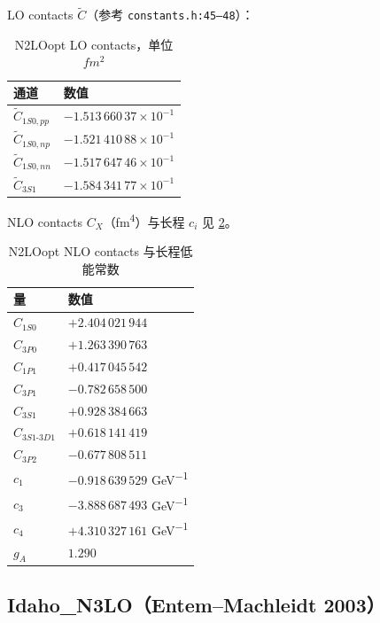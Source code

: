 LO contacts $\widetilde{C}$（参考 \texttt{constants.h:45–48}）：
\begin{table}[htbp]
\centering
\caption{N2LOopt LO contacts，单位 $\si{fm^2}$}
\label{tab:appA_n2loopt_lo}
\begin{tabular}{@{}ll@{}}
\toprule
通道 & 数值 \\
\midrule
$\widetilde{C}_{1S0,pp}$ & $-1.513\,660\,37 \times 10^{-1}$ \\
$\widetilde{C}_{1S0,np}$ & $-1.521\,410\,88 \times 10^{-1}$ \\
$\widetilde{C}_{1S0,nn}$ & $-1.517\,647\,46 \times 10^{-1}$ \\
$\widetilde{C}_{3S1}$    & $-1.584\,341\,77 \times 10^{-1}$ \\
\bottomrule
\end{tabular}
\end{table}
NLO contacts $C_X$（\si{fm^4}）与长程 $c_i$ 见 \cref{tab:appA_n2loopt_nlo}。
\begin{table}[htbp]
\centering
\caption{N2LOopt NLO contacts 与长程低能常数}
\label{tab:appA_n2loopt_nlo}
\begin{tabular}{@{}ll@{}}
\toprule
量 & 数值 \\
\midrule
$C_{1S0}$        & $+2.404\,021\,944$ \\
$C_{3P0}$        & $+1.263\,390\,763$ \\
$C_{1P1}$        & $+0.417\,045\,542$ \\
$C_{3P1}$        & $-0.782\,658\,500$ \\
$C_{3S1}$        & $+0.928\,384\,663$ \\
$C_{3S1\text{-}3D1}$ & $+0.618\,141\,419$ \\
$C_{3P2}$        & $-0.677\,808\,511$ \\
\midrule
$c_1$            & $-0.918\,639\,529$ \si{GeV^{-1}} \\
$c_3$            & $-3.888\,687\,493$ \si{GeV^{-1}} \\
$c_4$            & $+4.310\,327\,161$ \si{GeV^{-1}} \\
$g_A$            & $1.290$ \\
\bottomrule
\end{tabular}
\end{table}

\subsection{Idaho\_N3LO（Entem–Machleidt 2003）}


